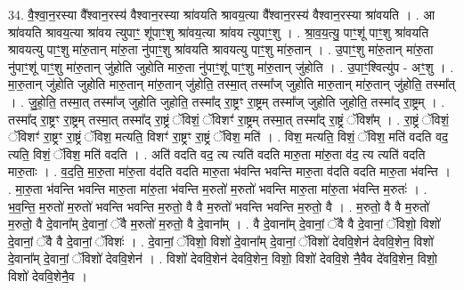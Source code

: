 \documentclass[17pt]{extarticle}
\begin{document}
34. वै॒श्वा॒न॒रस्या वै᳚श्वान॒रस्य॑ वैश्वान॒रस्या श्रा॑वयति श्रावय॒त्या वै᳚श्वान॒रस्य॑ वैश्वान॒रस्या श्रा॑वयति । . आ श्रा॑वयति श्रावय॒त्या श्रा॑वय त्युपाꣳ॒॒ शू॑पाꣳ॒॒शु श्रा॑वय॒त्या श्रा॑वय त्युपाꣳ॒॒शु । . श्रा॒व॒य॒त्यु॒ पाꣳ॒॒शू॑ पाꣳ॒॒शु श्रा॑वयति श्रावयत्यु पाꣳ॒॒शु मा॑रु॒तान् मा॑रु॒ता नु॑पाꣳ॒॒शु श्रा॑वयति श्रावयत्यु पाꣳ॒॒शु मा॑रु॒तान् । . उ॒पाꣳ॒॒शु मा॑रु॒तान् मा॑रु॒ता नु॑पाꣳ॒॒शू॑ पाꣳ॒॒शु मा॑रु॒तान् जु॑होति जुहोति मारु॒ता नु॑पाꣳ॒॒शू॑ पाꣳ॒॒शु मा॑रु॒तान् जु॑होति । . उ॒पाꣳ॒॒श्वित्यु॑प - अꣳ॒॒शु । . मा॒रु॒तान् जु॑होति जुहोति मारु॒तान् मा॑रु॒तान् जु॑होति॒ तस्मा॒त् तस्मा᳚ज् जुहोति मारु॒तान् मा॑रु॒तान् जु॑होति॒ तस्मा᳚त् । . जु॒हो॒ति॒ तस्मा॒त् तस्मा᳚ज् जुहोति जुहोति॒ तस्मा᳚द् रा॒ष्ट्रꣳ रा॒ष्ट्रम् तस्मा᳚ज् जुहोति जुहोति॒ तस्मा᳚द् रा॒ष्ट्रम् । . तस्मा᳚द् रा॒ष्ट्रꣳ रा॒ष्ट्रम् तस्मा॒त् तस्मा᳚द् रा॒ष्ट्रं ॅविशं॒ ॅविशꣳ॑ रा॒ष्ट्रम् तस्मा॒त् तस्मा᳚द् रा॒ष्ट्रं ॅविश᳚म् । . रा॒ष्ट्रं ॅविशं॒ ॅविशꣳ॑ रा॒ष्ट्रꣳ रा॒ष्ट्रं ॅविश॒ मत्यति॒ विशꣳ॑ रा॒ष्ट्रꣳ रा॒ष्ट्रं ॅविश॒ मति॑ । . विश॒ मत्यति॒ विशं॒ ॅविश॒ मति॑ वदति वद॒ त्यति॒ विशं॒ ॅविश॒ मति॑ वदति । . अति॑ वदति वद॒ त्य त्यति॑ वदति मारु॒ता मा॑रु॒ता व॑द॒ त्य त्यति॑ वदति मारु॒ताः । . व॒द॒ति॒ मा॒रु॒ता मा॑रु॒ता व॑दति वदति मारु॒ता भ॑वन्ति भवन्ति मारु॒ता व॑दति वदति मारु॒ता भ॑वन्ति । . मा॒रु॒ता भ॑वन्ति भवन्ति मारु॒ता मा॑रु॒ता भ॑वन्ति म॒रुतो॑ म॒रुतो॑ भवन्ति मारु॒ता मा॑रु॒ता भ॑वन्ति म॒रुतः॑ । . भ॒व॒न्ति॒ म॒रुतो॑ म॒रुतो॑ भवन्ति भवन्ति म॒रुतो॒ वै वै म॒रुतो॑ भवन्ति भवन्ति म॒रुतो॒ वै । . म॒रुतो॒ वै वै म॒रुतो॑ म॒रुतो॒ वै दे॒वाना᳚म् दे॒वानां॒ ॅवै म॒रुतो॑ म॒रुतो॒ वै दे॒वाना᳚म् । . वै दे॒वाना᳚म् दे॒वानां॒ ॅवै वै दे॒वानां॒ ॅविशो॒ विशो॑ दे॒वानां॒ ॅवै वै दे॒वानां॒ ॅविशः॑ । . दे॒वानां॒ ॅविशो॒ विशो॑ दे॒वाना᳚म् दे॒वानां॒ ॅविशो॑ देववि॒शेन॑ देववि॒शेन॒ विशो॑ दे॒वाना᳚म् दे॒वानां॒ ॅविशो॑ देववि॒शेन॑ । . विशो॑ देववि॒शेन॑ देववि॒शेन॒ विशो॒ विशो॑ देववि॒शे नै॒वैव दे॑ववि॒शेन॒ विशो॒ विशो॑ देववि॒शेनै॒व । \newline
\end{document}
